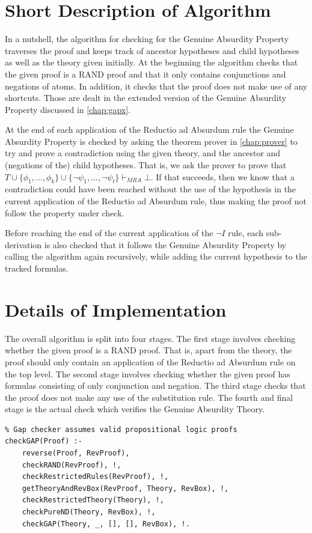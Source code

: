 \documentclass[11pt,twoside,a4paper]{report}
\begin{document}
\section{Short Description of Algorithm}
In a nutshell, the algorithm for checking for the Genuine Absurdity Property traverses the proof and keeps track of ancestor hypotheses and child hypotheses as well as the theory given initially. At the beginning the algorithm checks that the given proof is a RAND proof and that it only contains conjunctions and negations of atoms. In addition, it checks that the proof does not make use of any shortcuts. Those are dealt in the extended version of the Genuine Absurdity Property discussed in \autoref{chap:gapx}.

At the end of each application of the Reductio ad Absurdum rule the Genuine Absurdity Property is checked by asking the theorem prover in \autoref{chap:prover} to try and prove a contradiction using the given theory, and the ancestor and (negations of the) child hypotheses. That is, we ask the prover to prove that $T\cup\{\phi_1, ..., \phi_k\}\cup\{\neg\psi_1, ..., \neg\psi_l\}\vdash_{MRA}\bot$. If that succeeds, then we know that a contradiction could have been reached without the use of the hypothesis in the current application of the Reductio ad Absurdum rule, thus making the proof not follow the property under check.

Before reaching the end of the current application of the $\neg I$ rule, each sub-derivation is also checked that it follows the Genuine Absurdity Property by calling the algorithm again recursively, while adding the current hypothesis to the tracked formulas.

\section{Details of Implementation}
The overall algorithm is split into four stages. The first stage involves checking whether the given proof is a RAND proof. That is, apart from the theory, the proof should only contain an application of the Reductio ad Absurdum rule on the top level. The second stage involves checking whether the given proof has formulas consisting of only conjunction and negation. The third stage checks that the proof does not make any use of the substitution rule. The fourth and final stage is the actual check which verifies the Genuine Absurdity Theory.

\begin{lstlisting}[caption={Genuine Absurdity Property top level predicate},label=lst:gaptoppred]
% Checks that the given proof follows the GAP property
% Gap checker assumes valid propositional logic proofs
checkGAP(Proof) :- 
	reverse(Proof, RevProof), 
	checkRAND(RevProof), !,
	checkRestrictedRules(RevProof), !,
	getTheoryAndRevBox(RevProof, Theory, RevBox), !,
	checkRestrictedTheory(Theory), !,
	checkPureND(Theory, RevBox), !,
	checkGAP(Theory, _, [], [], RevBox), !.
\end{lstlisting}
\end{document}
